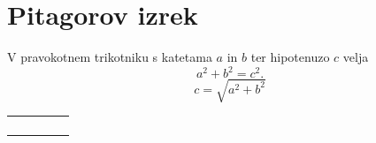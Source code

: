 \documentclass{article}
\begin{document}
\section*{Pitagorov izrek}
V pravokotnem trikotniku s katetama \(a\) in \(b\) ter hipotenuzo \(c\) velja
\[ a^2 + b^2 = c^2. \] \[c = \sqrt{a^2 + b^2}\]
\begin{table}[]
\centering
\begin{tabular}{lllll}
 &  &  &  &  \\ 
 &  &  &  &  \\   
 &  &  &  &  \\   
 &  &  &  &  
\end{tabular}
\end{table}
\end{document}
